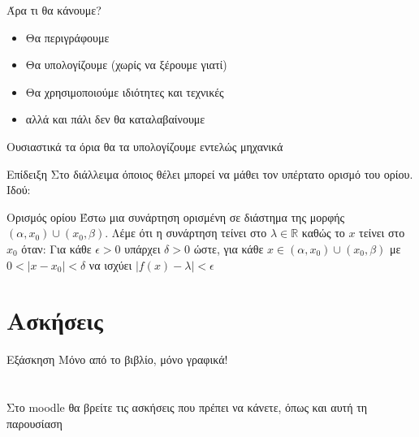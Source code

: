 \documentclass[greek]{beamer}
\begin{document}
\begin{frame}{Άρα τι θα κάνουμε?}
      \begin{itemize}
            \item Θα περιγράφουμε
                  \item<2->Θα υπολογίζουμε (χωρίς να ξέρουμε γιατί)
            \item<3-> Θα χρησιμοποιούμε ιδιότητες και τεχνικές
            \item<4-> αλλά και πάλι δεν θα καταλαβαίνουμε
      \end{itemize}
      Ουσιαστικά τα όρια θα τα υπολογίζουμε εντελώς μηχανικά
\end{frame}

\begin{frame}{Επίδειξη}
      Στο διάλλειμα όποιος θέλει μπορεί να μάθει τον υπέρτατο ορισμό του ορίου. Ιδού:
      \begin{block}{Ορισμός ορίου}
            Έστω μια συνάρτηση ορισμένη σε διάστημα της μορφής $(α,x_0)\cup (x_0,β)$. Λέμε ότι η συνάρτηση τείνει στο $λ\in\mathbb{R}$ καθώς το $x$ τείνει στο $x_0$ όταν:
            \newline
            \newline
            Για κάθε $\epsilon>0$ υπάρχει $δ>0$ ώστε, για κάθε $x\in (α,x_0)\cup (x_0,β)$ με $0<|x-x_0|<δ$ να ισχύει $|f(x)-λ|<\epsilon$
      \end{block}

\end{frame}

\section{Ασκήσεις}
\begin{frame}{Εξάσκηση}
      Μόνο από το βιβλίο, μόνο γραφικά!
\end{frame}

\section{}
\begin{frame}
      Στο moodle θα βρείτε τις ασκήσεις που πρέπει να κάνετε, όπως και αυτή τη παρουσίαση
\end{frame}
\end{document}
